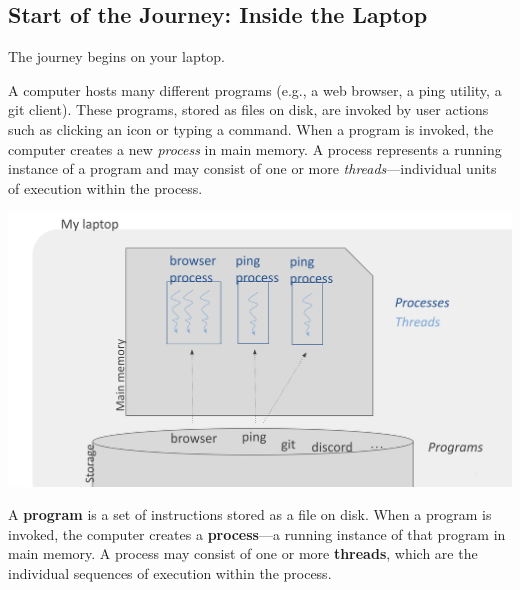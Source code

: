 \subsection{Start of the Journey: Inside the Laptop}
The journey begins on your laptop.\\[5px] 
\begin{minipage}{0.45\textwidth}
  \begin{justify}
    A computer hosts many different programs (e.g., a web browser, a ping utility, a git client). These programs, stored as files on disk, are invoked by user actions such as clicking an icon or typing a command. When a program is invoked, the computer creates a new \emph{process} in main memory. A process represents a running instance of a program and may consist of one or more \emph{threads}—individual units of execution within the process.
  \end{justify}
\end{minipage}
\hfill
\vline
\hfill
\begin{minipage}{0.45\textwidth}
  \begin{center}
  \includegraphics[width=1.2\textwidth]{chapters/L1/images/threads.png}
\end{center}
\end{minipage}\vfill
\vfill
\begin{definition}
A \textbf{program} is a set of instructions stored as a file on disk. When a program is invoked, the computer creates a \textbf{process}—a running instance of that program in main memory. A process may consist of one or more \textbf{threads}, which are the individual sequences of execution within the process.
\end{definition}

\vfill
